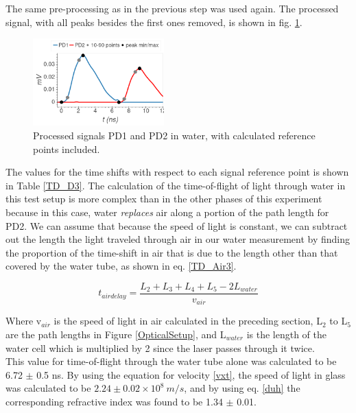 \documentclass[aps,prl,reprint]{revtex4-2}
\begin{document}
The same pre-processing as in the previous step was used again.
The processed signal, with all peaks besides the
first ones removed, is shown in fig. \ref{water_boke}. \\

\begin{figure}[h]
\includegraphics[width=0.45\textwidth]{../Images/l4_D_c.png}
\caption{\label{water_boke} Processed signals PD1 and PD2 in water, with calculated
	reference points included.}
\end{figure}

The values for the time shifts with respect to each signal reference point is shown in
Table \ref{TD_D3}. The calculation of the time-of-flight of light through water in this
test setup is more complex than in the other phases of this experiment because in this
case, water \emph{replaces} air along a portion of the path length for PD2. We can
assume that because the speed of light is constant, we can subtract out the length
the light traveled through air in our water measurement by finding the proportion
of the time-shift in air that is due to the length other than that covered by the water
tube, as shown in eq. \ref{TD_Air3}. 

\begin{equation} 
t_{air delay} = \frac{L_2+L_3+L_4+L_5 - 2L_{water}}{v_{air}}
\label{TD_Air3}
\end{equation}

Where v$_{air}$ is the speed of light in air calculated in the preceding section, L$_2$ to L$_5$ are the path 
lengths in Figure \ref{OpticalSetup}, and L$_{water}$ is the length of the water cell which is multiplied by 2 
since the laser passes through it twice. \\

This value for time-of-flight through the water tube alone was calculated to be 6.72 $\pm$ 0.5 ns. 
By using the equation for velocity \ref{vxt}, the speed of light in glass was calculated
to be $2.24 \pm 0.02 \times 10^8\ m/s$, and
by using eq. \ref{duh} the corresponding refractive index was found to be 1.34 $\pm$ 0.01.\\
\end{document}
